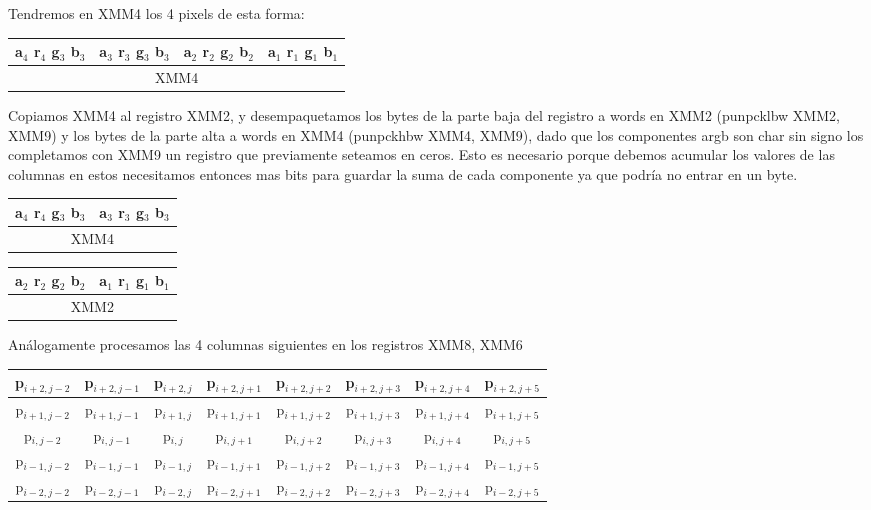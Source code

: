 Tendremos en XMM4 los 4 pixels de esta forma:

\begin{table}[!h]
	\centering
	\begin{tabular}{| c | c | c | c |}
		\hline
		a$_4$ r$_4$ g$_3$ b$_3$ & a$_3$ r$_3$ g$_3$ b$_3$ & a$_2$ r$_2$ g$_2$ b$_2$ & a$_1$ r$_1$ g$_1$ b$_1$
		\\ \hline
		\multicolumn{4}{c}{XMM4} \\
	\end{tabular}
\end{table}


Copiamos XMM4 al registro XMM2, y desempaquetamos los bytes de la parte baja del registro a words en XMM2 (punpcklbw XMM2, XMM9) y los bytes de la parte alta a words en XMM4 (punpckhbw XMM4, XMM9), dado que los componentes argb son char sin signo los completamos con XMM9 un registro que previamente seteamos en ceros. Esto es necesario porque debemos acumular los valores de las columnas en estos necesitamos entonces mas bits para guardar la suma de cada componente ya que podría no entrar en un byte.

\begin{table}[!h]
	\centering
	\begin{tabular}{| c | c |}
		\hline
		a$_4$ r$_4$ g$_3$ b$_3$ & a$_3$ r$_3$ g$_3$ b$_3$
		\\ \hline
		\multicolumn{2}{c}{XMM4} \\
	\end{tabular}
		\begin{tabular}{| c | c |}
		\hline
		a$_2$ r$_2$ g$_2$ b$_2$ & a$_1$ r$_1$ g$_1$ b$_1$
		\\ \hline
		\multicolumn{2}{c}{XMM2} \\
	\end{tabular}
\end{table}

Análogamente procesamos las 4 columnas siguientes en los registros XMM8, XMM6

\begin{table}[!h]
	\centering
	\begin{tabular}{| c | c | c | c | c | c | c | c |}
		\hline
		p$_{i+2,j-2}$ & p$_{i+2,j-1}$ & p$_{i+2,j}$ & p$_{i+2,j+1}$ & \cellcolor{blue!25}p$_{i+2,j+2}$ & \cellcolor{blue!25}p$_{i+2,j+3}$ & \cellcolor{blue!25}p$_{i+2,j+4}$ & \cellcolor{blue!25}p$_{i+2,j+5}$
		\\ \hline
		p$_{i+1,j-2}$ & p$_{i+1,j-1}$ & p$_{i+1,j}$ & p$_{i+1,j+1}$ & p$_{i+1,j+2}$ & p$_{i+1,j+3}$ & p$_{i+1,j+4}$ & p$_{i+1,j+5}$
		\\ \hline
		p$_{i,j-2}$ & p$_{i,j-1}$ & p$_{i,j}$ & p$_{i,j+1}$ & p$_{i,j+2}$ & p$_{i,j+3}$ & p$_{i,j+4}$ & p$_{i,j+5}$
		\\ \hline
		p$_{i-1,j-2}$ & p$_{i-1,j-1}$ & p$_{i-1,j}$ & p$_{i-1,j+1}$ & p$_{i-1,j+2}$ & p$_{i-1,j+3}$ & p$_{i-1,j+4}$ & p$_{i-1,j+5}$
		\\ \hline
		p$_{i-2,j-2}$ & p$_{i-2,j-1}$ & p$_{i-2,j}$ & p$_{i-2,j+1}$ & p$_{i-2,j+2}$ & p$_{i-2,j+3}$ & p$_{i-2,j+4}$ & p$_{i-2,j+5}$
		\\ \hline
	\end{tabular}	
\end{table}

